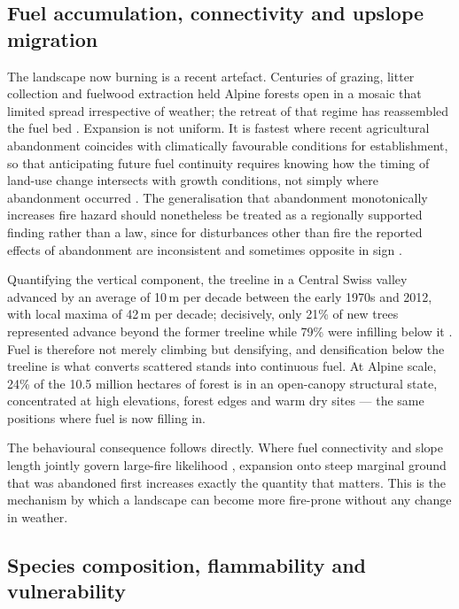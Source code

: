 \documentclass[11pt,a4paper]{article}
\begin{document}
\subsection{Fuel accumulation, connectivity and upslope migration}

The landscape now burning is a recent artefact. Centuries of grazing, litter collection and fuelwood extraction held Alpine forests open in a mosaic that limited spread irrespective of weather; the retreat of that regime has reassembled the fuel bed \citep{bebi_changes_2017}. Expansion is not uniform. It is fastest where recent agricultural abandonment coincides with climatically favourable conditions for establishment, so that anticipating future fuel continuity requires knowing how the timing of land-use change intersects with growth conditions, not simply where abandonment occurred \citep{garbarino_contrasting_2020}. The generalisation that abandonment monotonically increases fire hazard should nonetheless be treated as a regionally supported finding rather than a law, since for disturbances other than fire the reported effects of abandonment are inconsistent and sometimes opposite in sign \citep{mantero_influence_2020}.

Quantifying the vertical component, the treeline in a Central Swiss valley advanced by an average of 10\,m per decade between the early 1970s and 2012, with local maxima of 42\,m per decade; decisively, only 21\% of new trees represented advance beyond the former treeline while 79\% were infilling below it \citep{frei_evidence_2023}. Fuel is therefore not merely climbing but densifying, and densification below the treeline is what converts scattered stands into continuous fuel. At Alpine scale, 24\% of the 10.5 million hectares of forest is in an open-canopy structural state, concentrated at high elevations, forest edges and warm dry sites \citep{stritih_alternative_2023} --- the same positions where fuel is now filling in.

The behavioural consequence follows directly. Where fuel connectivity and slope length jointly govern large-fire likelihood \citep{conedera_linking_2024}, expansion onto steep marginal ground that was abandoned first increases exactly the quantity that matters. This is the mechanism by which a landscape can become more fire-prone without any change in weather.

\subsection{Species composition, flammability and vulnerability}
\end{document}
